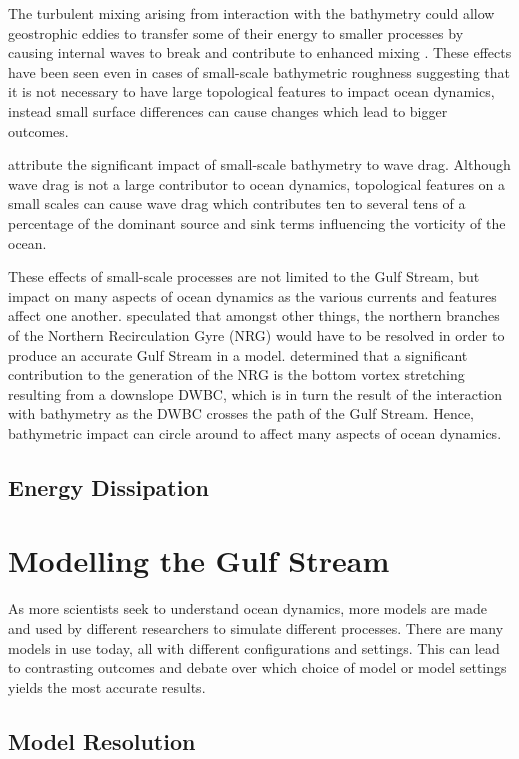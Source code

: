\documentclass[..\EOYR.tex]{subfiles}
\begin{document}
The turbulent mixing arising from interaction with the bathymetry could allow geostrophic eddies to transfer some of their energy to smaller processes by causing internal waves to break and contribute to enhanced mixing \citep{Nikurashin2012a}. These effects have been seen even in cases of small-scale bathymetric roughness suggesting that it is not necessary to have large topological features to impact ocean dynamics, instead small surface differences can cause changes which lead to bigger outcomes.

\citep{NaveiraGarabato2013} attribute the significant impact of small-scale bathymetry to wave drag. Although wave drag is not a large contributor to ocean dynamics, topological features on a small scales can cause wave drag which contributes ten to several tens of a percentage of the dominant source and sink terms influencing the vorticity of the ocean.


These effects of small-scale processes are not limited to the Gulf Stream, but impact on many aspects of ocean dynamics as the various currents and features affect one another. 
\citep{Ezer2016b} speculated that amongst other things, the northern branches of the Northern Recirculation Gyre (NRG) would have to be resolved in order to produce an accurate Gulf Stream in a model. \citep{Zhang2007} determined that a significant contribution to the generation of the NRG is the bottom vortex stretching resulting from a downslope DWBC, which is in turn the result of the interaction with bathymetry as the DWBC crosses the path of the Gulf Stream. Hence, bathymetric impact can circle around to affect many aspects of ocean dynamics.


\subsection{Energy Dissipation}

\section{Modelling the Gulf Stream}

As more scientists seek to understand ocean dynamics, more models are made and used by different researchers to simulate different processes. There are many models in use today, all with different configurations and settings. This can lead to contrasting outcomes and debate over which choice of model or model settings yields the most accurate results.

\subsection*{Model Resolution}
\end{document}
